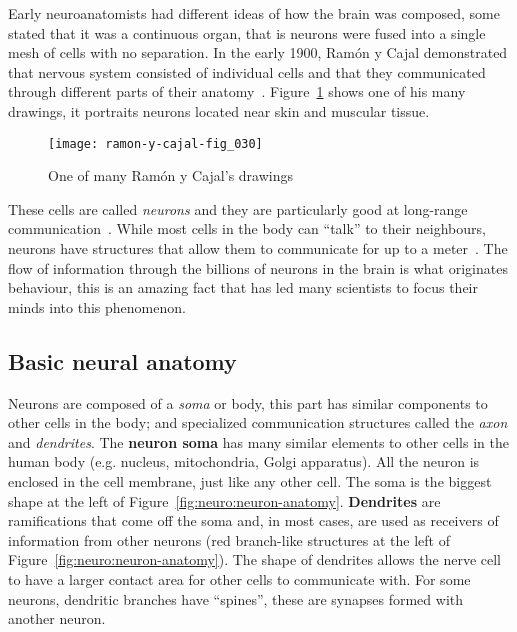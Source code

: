 Early neuroanatomists had different ideas of how the brain was composed, some stated that it was a continuous organ, that is neurons were fused into a single mesh of cells with no separation. In the early 1900, Ramón y Cajal demonstrated that nervous system consisted of individual cells and that they communicated through different parts of their anatomy~\cite{Nemri:2010}. Figure~\ref{fig:neuro:ramon-y-cajal-neuro} shows one of his many drawings, it portraits neurons located near skin and muscular tissue.

\begin{figure}[hbt]
  \begin{center}
    \texttt{[image: ramon-y-cajal-fig\_030]}
    \caption{One of many Ramón y Cajal's drawings~\cite{cervantes-images}}
    \label{fig:neuro:ramon-y-cajal-neuro}
  \end{center}
\end{figure}

These cells are called \emph{neurons} and they are particularly good at  long-range communication~\cite{thompson2000brain}. While most cells in the body can ``talk'' to their neighbours, neurons have structures that allow them to communicate for up to a meter~\cite{eye-brain-vision-hubel1995}. The flow of information through the billions of neurons in the brain is what originates behaviour, this is an amazing fact that has led many scientists to focus their minds into this phenomenon.

\subsection{Basic neural anatomy}

Neurons are composed of a \emph{soma} or body, this part has similar components to other cells in the body; and specialized communication structures called the \emph{axon} and \emph{dendrites}. The \textbf{neuron soma} has many similar elements to other cells in the human body (e.g. nucleus, mitochondria, Golgi apparatus). All the neuron is enclosed in the cell membrane, just like any other cell. The soma is the biggest shape at the left of Figure~\ref{fig:neuro:neuron-anatomy}. \textbf{Dendrites} are ramifications that come off the soma and, in most cases, are used as receivers of information from other neurons (red branch-like structures at the left of Figure~\ref{fig:neuro:neuron-anatomy}). The shape of dendrites allows the nerve cell to have a larger contact area for other cells to communicate with. For some neurons, dendritic branches have ``spines'', these are synapses formed with another neuron.

